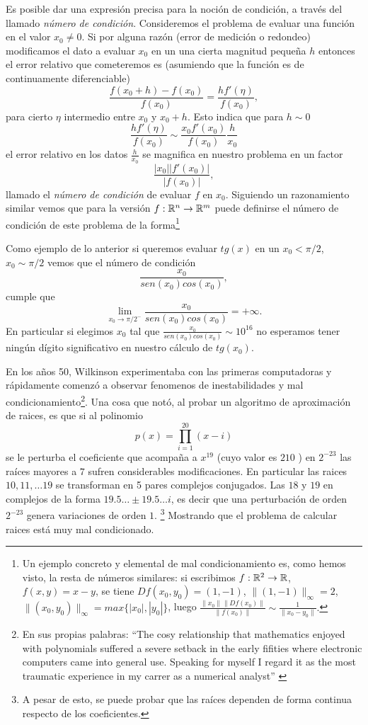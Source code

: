 \begin{tcolorbox}
Es posible dar una expresión precisa para la noción de condición, a través del llamado
\emph{número de condición}. Consideremos el problema de evaluar una función en el valor $x_0\neq 0$. Si por alguna razón (error de medición o redondeo) modificamos el dato a evaluar $x_0$ en un una cierta magnitud pequeña $h$ entonces el error relativo que cometeremos es (asumiendo que la función es de continuamente diferenciable)
$$
\frac{f(x_0+h)-f(x_0)}{f(x_0)}=
\frac{hf'(\eta)}{f(x_0)},$$
para cierto $\eta$ intermedio entre $x_0$ y $x_0+h$. Esto indica que para $h\sim 0$
$$
\frac{hf'(\eta)}{f(x_0)}\sim
\frac{x_0f'(x_0)}{f(x_0)}\frac{h}{x_0}
$$
el error relativo en los datos $\frac{h}{x_0}$ se magnifica en nuestro problema en un factor
$$
\frac{|x_0||f'(x_0)|}{|f(x_0)|},
$$
llamado el \emph{número de condición} de evaluar $f$ en $x_0$. Siguiendo un razonamiento similar vemos que para la versión $f:\mathbb R^{n}\to \mathbb R^{m}$ puede definirse el número de condición de este problema de la forma\footnote{Un ejemplo concreto y elemental de mal condicionamiento es, como hemos visto, la resta de números similares: si escribimos
$f:\mathbb R^2\to \mathbb R$, $f(x,y)=x-y$, se tiene $Df(x_0,y_0)=(1,-1)$, $\|(1,-1)\|_{\infty}=2$, $\|(x_0,y_0)\|_{\infty}=max\{|x_0|,|y_0|\}$, luego $\frac{\|x_0\|\|Df(x_0)\|}{\|f(x_0)\|}\sim \frac{1}{\|x_0-y_0\|}.$}
\end{tcolorbox}
Como ejemplo de lo anterior
si queremos evaluar $tg(x)$ en un $x_0<\pi/2$, $x_0\sim \pi/2$ vemos que el número de condición
$$
\frac{x_0}{sen(x_0)cos(x_0)},
$$
cumple que
$$
\lim_{x_0\to \pi/2^-} \frac{x_0}{sen(x_0)cos(x_0)}=+\infty.
$$
En particular si elegimos  $x_0$ tal que $\frac{x_0}{sen(x_0)cos(x_0)}\sim 10^{16}$ no esperamos tener ningún dígito significativo en nuestro cálculo de $tg(x_0)$.


En los años 50, Wilkinson experimentaba con las primeras computadoras y rápidamente comenzó a observar fenomenos de inestabilidades y mal condicionamiento\footnote{En sus propias palabras: ``The cosy relationship that mathematics enjoyed with polynomials suffered a severe setback in the early fifities where electronic computers came into general use. Speaking for myself I regard it as the most traumatic experience in my carrer as a numerical analyst'' \cite{Wil}  }. Una cosa que notó, al probar un algoritmo de aproximación de raices, es que si al polinomio
$$
p(x)=\prod_{i=1}^{20}(x-i)
$$
se le perturba el coeficiente que acompaña a $x^{19}$ (cuyo valor es $210$ ) en $2^{-23}$ las raíces mayores a $7$ sufren considerables modificaciones. En particular las raices  $10,11,\dots 19$
se transforman en 5 pares complejos conjugados. Las $18$ y $19$ en complejos de la forma $19.5\dots\pm 19.5\dots i$, es decir que una perturbación de orden $2^{-23}$ genera variaciones de orden $1$. \footnote{A pesar de esto, se puede probar que las raíces dependen de forma continua respecto de los coeficientes.} Mostrando que el problema de calcular raices está muy mal condicionado.

